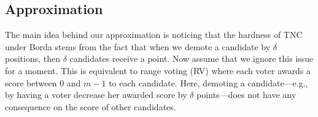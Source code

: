 \documentclass[letterpaper]{article} %
\newcommand{\CUBNBwTA}{Unlimited Borda \SB}
\newcommand{\SB}{\textsc{TNC}}
\newcommand{\abs}[1]{\lvert{#1}\rvert}
\newcommand{\diff}{\mathrm{diff}}
\begin{document}


\subsection{Approximation}
The main idea behind our approximation is noticing that the hardness of \SB{} under Borda stems from the fact that when we demote a candidate by $\delta$ positions, then $\delta$ candidates receive a point. Now assume that we ignore this issue for a moment. This is equivalent to  range voting (RV) where each voter awards a score between $0$ and $m-1$ to each candidate. Here, demoting a candidate---e.g., by having a voter decrease her awarded score by $\delta$ points---does not have any consequence on the score of other candidates.
\end{document}
